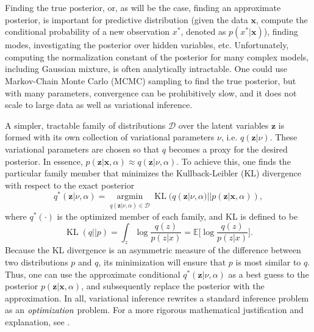 \documentclass[fleqn,usenatbib,useAMS]{mnras}
\begin{document}
Finding the true posterior, or, as will be the case, finding an approximate posterior, is important for predictive distribution (given the data $\textbf{x}$, compute the conditional probability of a new observation $x^*$, denoted as $p(x^*|\textbf{x})$), finding modes, investigating the posterior over hidden variables, etc. Unfortunately, computing the normalization constant of the posterior for many complex models, including Gaussian mixture, is often analytically intractable. One could use Markov-Chain Monte Carlo (MCMC) sampling \citep{Hastings70, Gelfand90} to find the true posterior, but with many parameters, convergence can be prohibitively slow, and it does not scale to large data as well as variational inference. \par

A simpler, tractable family of distributions $\mathcal{D}$ over the latent variables $\textbf{z}$ is formed with its own collection of variational parameters $\nu$, i.e. $q(\textbf{z}|\nu)$. These variational parameters are chosen so that $q$ becomes a proxy for the desired posterior. In essence, $p(\textbf{z}|\textbf{x}, \alpha) \approx q(\textbf{z}|\nu, \alpha)$. To achieve this, one finds the particular family member that minimizes the Kullback-Leibler (KL) divergence with respect to the exact posterior 
%
\begin{equation}
    q^*(\textbf{z}|\nu, \alpha) = \operatorname*{argmin}_{q(\textbf{z}|\nu, \alpha) \in \mathcal{D}} \operatorname*{KL}(q(\textbf{z}|\nu, \alpha)||p(\textbf{z}|\textbf{x}, \alpha)),
\end{equation}
%
where $q^*(\cdot)$ is the optimized member of each family, and KL is defined to be
%
\begin{equation}
    \operatorname*{KL}(q||p) = \int_z \operatorname*{log} \frac{q(z)}{p(z|x)} = \mathbb{E}\Big[\operatorname*{log}\frac{q(z)}{p(z|x)}\Big].
\end{equation}
%
Because the KL divergence is an asymmetric measure of the difference between two distributions $p$ and $q$, its minimization will ensure that $p$ is most similar to $q$. Thus, one can use the approximate conditional $q^*(\textbf{z}|\nu, \alpha)$ as a best guess to the posterior $p(\textbf{z}|\textbf{x}, \alpha)$, and subsequently replace the posterior with the approximation. In all, variational inference rewrites a standard inference problem as an $\emph{optimization}$ problem.
For a more rigorous mathematical justification and explanation, see \cite{Blei17}. \par
\end{document}
